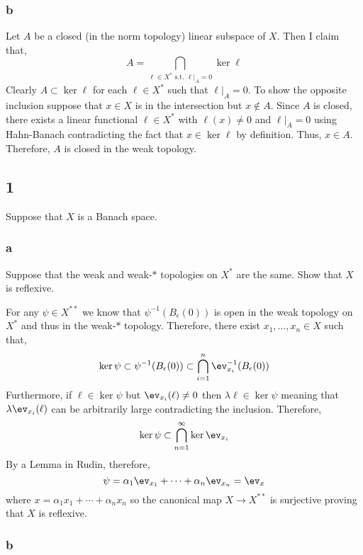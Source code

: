 \documentclass[12pt]{article}
\begin{document}
\subsubsection{b}

Let $A$ be a closed (in the norm topology) linear subspace of $X$. Then I claim that,
\[ A = \bigcap_{\ell \in X^* \text{ s.t. } \ell|_A = 0} \ker{\ell} \]
Clearly $A \subset \ker{\ell}$ for each $\ell \in X^*$ such that $\ell|_A = 0$. To show the opposite inclusion suppose that $x \in X$ is in the intersection but $x \notin A$. Since $A$ is closed, there exists a linear functional $\ell \in X^*$ with $\ell(x) \neq 0$ and $\ell|_A = 0$ using Hahn-Banach contradicting the fact that $x \in \ker{\ell}$ by definition. Thus, $x \in A$. Therefore, $A$ is closed in the weak topology.

\subsection{1}

Suppose that $X$ is a Banach space.

\subsubsection{a}

\begin{exercise}
Suppose that the weak and weak-$*$ topologies on $X^*$ are the same. Show that $X$ is reflexive.
\end{exercise}

For any $\psi \in X^{**}$ we know that $\psi^{-1}(B_\epsilon(0))$ is open in the weak topology on $X^*$ and thus in the weak-$*$ topology. Therefore, there exist $x_1, \dots, x_n \in X$ such that,
\[ \ker{\psi} \subset \psi^{-1}(B_\epsilon(0)) \subset \bigcap_{i = 1}^n \ev_{x_i}^{-1}(B_\epsilon(0)) \]
Furthermore, if $\ell \in \ker{\psi}$ but $\ev_{x_i}(\ell) \neq 0$ then $\lambda \ell \in \ker{\psi}$ meaning that $\lambda \ev_{x_i}(\ell)$ can be arbitrarily large contradicting the inclusion. Therefore, 
\[ \ker{\psi} \subset \bigcap_{n = 1}^\infty \ker{\ev_{x_i}} \]
By a Lemma in Rudin, therefore,
\[ \psi = \alpha_1 \ev_{x_1} + \cdots + \alpha_n \ev_{x_n} = \ev_{x} \]
where $x = \alpha_1 x_1 + \cdots + \alpha_n x_n$
so the canonical map $X \to X^{**}$ is surjective proving that $X$ is reflexive.

\subsubsection{b}
\end{document}
